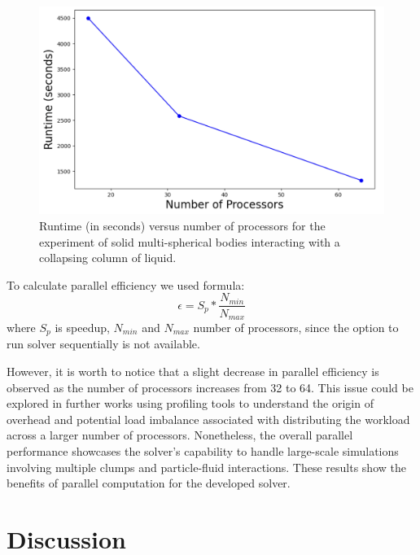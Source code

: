 
\begin{figure}[H]
    \centering
    \includegraphics[width=15cm]{Images/chap3/parallel_runtime.png}
    \caption{Runtime (in seconds) versus number of processors for the experiment of solid multi-spherical bodies interacting with a collapsing column of liquid. }
    \label{fig:runtime}
\end{figure}


To calculate parallel efficiency we used formula:
$$\epsilon = S_p * \frac {N_{min}}{N_{max}}$$
where $S_p$ is speedup, $N_{min}$ and $N_{max}$ number of processors, since the option to run solver sequentially is not available.

However, it is worth to notice that a slight decrease in parallel efficiency is observed as the number of processors increases from 32 to 64. This issue could be explored in further works using profiling tools to understand the origin of overhead and potential load imbalance associated with distributing the workload across a larger number of processors. Nonetheless, the overall parallel performance showcases the solver's capability to handle large-scale simulations involving multiple clumps and particle-fluid interactions. These results show the benefits of parallel computation for the developed solver.

\section{Discussion}

